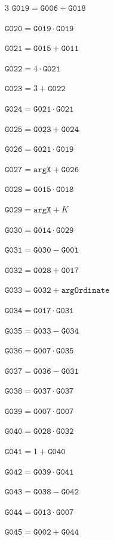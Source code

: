 \documentclass[10pt]{article}
\begin{document}
\begin{multicols}{3}
\noindent $\mathtt{G019}=\mathtt{G006}+\mathtt{G018}$\par
\noindent $\mathtt{G020}=\mathtt{G019}\cdot \mathtt{G019}$\par
\noindent $\mathtt{G021}=\mathtt{G015}+\mathtt{G011}$\par
\noindent $\mathtt{G022}=4\cdot \mathtt{G021}$\par
\noindent $\mathtt{G023}=3+\mathtt{G022}$\par
\noindent $\mathtt{G024}=\mathtt{G021}\cdot \mathtt{G021}$\par
\noindent $\mathtt{G025}=\mathtt{G023}+\mathtt{G024}$\par
\noindent $\mathtt{G026}=\mathtt{G021}\cdot \mathtt{G019}$\par
\noindent $\mathtt{G027}=\mathtt{argX}+\mathtt{G026}$\par
\noindent $\mathtt{G028}=\mathtt{G015}\cdot \mathtt{G018}$\par
\noindent $\mathtt{G029}=\mathtt{argX}+K$\par
\noindent $\mathtt{G030}=\mathtt{G014}\cdot \mathtt{G029}$\par
\noindent $\mathtt{G031}=\mathtt{G030}-\mathtt{G001}$\par
\noindent $\mathtt{G032}=\mathtt{G028}+\mathtt{G017}$\par
\noindent $\mathtt{G033}=\mathtt{G032}+\mathtt{argOrdinate}$\par
\noindent $\mathtt{G034}=\mathtt{G017}\cdot \mathtt{G031}$\par
\noindent $\mathtt{G035}=\mathtt{G033}-\mathtt{G034}$\par
\noindent $\mathtt{G036}=\mathtt{G007}\cdot \mathtt{G035}$\par
\noindent $\mathtt{G037}=\mathtt{G036}-\mathtt{G031}$\par
\noindent $\mathtt{G038}=\mathtt{G037}\cdot \mathtt{G037}$\par
\noindent $\mathtt{G039}=\mathtt{G007}\cdot \mathtt{G007}$\par
\noindent $\mathtt{G040}=\mathtt{G028}\cdot \mathtt{G032}$\par
\noindent $\mathtt{G041}=1+\mathtt{G040}$\par
\noindent $\mathtt{G042}=\mathtt{G039}\cdot \mathtt{G041}$\par
\noindent $\mathtt{G043}=\mathtt{G038}-\mathtt{G042}$\par
\noindent $\mathtt{G044}=\mathtt{G013}\cdot \mathtt{G007}$\par
\noindent $\mathtt{G045}=\mathtt{G002}+\mathtt{G044}$\par

\end{multicols}
\end{document}
